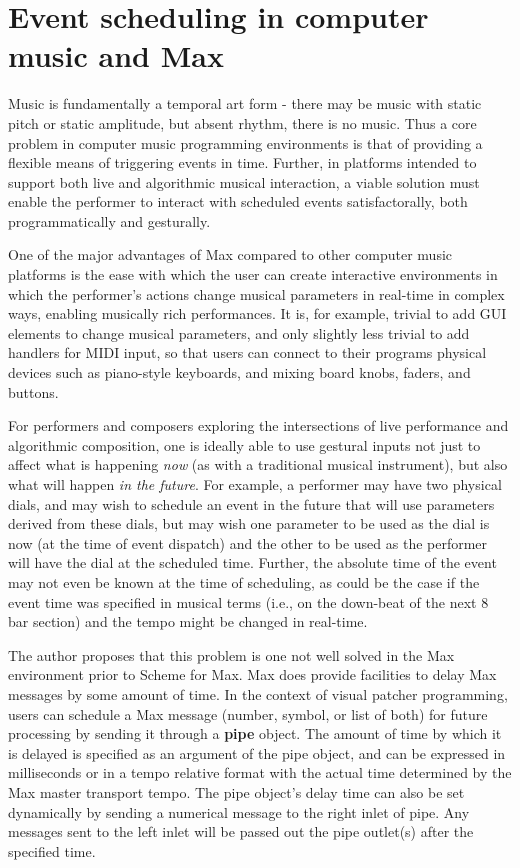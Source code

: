 \documentclass[acmsmall]{acmart}
\begin{document}
\section{Event scheduling in computer music and Max}

Music is fundamentally a temporal art form - there may be music with static pitch
or static amplitude, but absent rhythm, there is no music.  
Thus a core problem in computer music programming environments is that of providing a flexible 
means of triggering events in time. Further, in platforms intended to support both
live and algorithmic musical interaction, a viable solution must enable the performer
to interact with scheduled events satisfactorally, both programmatically and gesturally. 

One of the major advantages of Max compared to other computer music platforms 
is the ease with which the user can create interactive environments in which the performer's actions 
change musical parameters in real-time in complex ways, enabling 
musically rich performances. It is, for example, trivial to add GUI elements to change
musical parameters, and only slightly less trivial to add handlers for MIDI input, 
so that users can connect to their programs physical devices such as
piano-style keyboards, and mixing board knobs, faders, and buttons. 

For performers and composers exploring the intersections of live performance and algorithmic
composition, one is ideally able to use gestural inputs not just to affect
what is happening \textit{now} (as with a traditional musical instrument), but also what will 
happen \textit{in the future}. For example, a performer may have two physical dials,
and may wish to schedule an event in the future that will use parameters derived
from these dials, but may wish one parameter to be used as the dial is now
(at the time of event dispatch) 
and the other to be used as the performer will have the dial at the scheduled time.
Further, the absolute time of the event may not even be known at the time of 
scheduling, as could be the case if the event time was specified in musical terms 
(i.e., on the down-beat of the next 8 bar section) and the tempo might be changed in real-time. 

The author proposes that this problem is one not well solved in the Max environment prior 
to Scheme for Max. Max does provide facilities to delay Max messages by some
amount of time. In the context of visual patcher programming, users can schedule 
a Max message (number, symbol, or list of both) for future processing by sending it through a 
\textbf{pipe} object. The amount of time by which it is delayed is specified as an argument of 
the pipe object, and can be expressed in milliseconds or in a tempo 
relative format with the actual time determined by the Max master transport tempo. 
The pipe object’s delay time can also be set dynamically by sending a numerical message
to the right inlet of pipe. Any messages sent to the left inlet will be passed out
the pipe outlet(s) after the specified time. 
\end{document}
